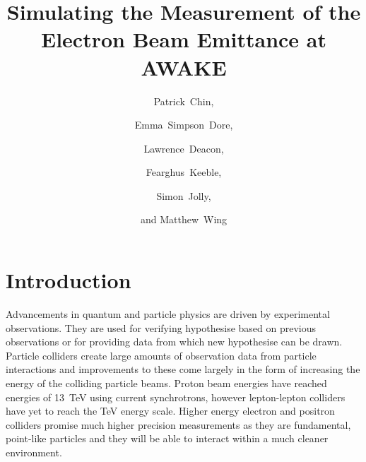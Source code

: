 \documentclass[a4paper]{report}
\begin{document}
\title{Simulating the Measurement of the\\Electron Beam Emittance at AWAKE}
\author{Patrick~Chin,}
\author{Emma~Simpson~Dore,}
\author{Lawrence~Deacon,}
\author{Fearghus~Keeble,}
\author{Simon~Jolly,}
\author{and Matthew~Wing}





\maketitle

\chapter{Introduction}

Advancements in quantum and particle physics are driven by experimental
observations. They are used for verifying hypothesise based on previous
observations or for providing data from which new hypothesise can be drawn.
Particle colliders create large amounts of observation data from particle
interactions and improvements to these come largely in the form of increasing
the energy of the colliding particle beams. Proton beam energies have reached
energies of \SI{13}{\tera\electronvolt} using current synchrotrons, however
lepton-lepton colliders have yet to reach the \si{\tera\electronvolt} energy
scale.  Higher energy electron and positron colliders promise much higher
precision measurements as they are fundamental, point-like particles and they
will be able to interact within a much cleaner environment.
\end{document}
